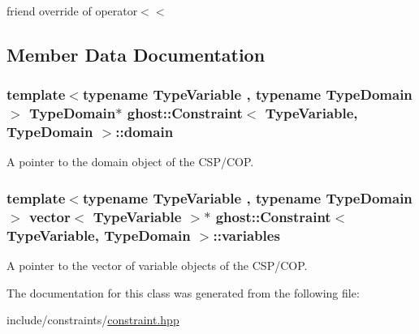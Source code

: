 friend override of operator$<$$<$ 



\subsection{Member Data Documentation}
\hypertarget{classghost_1_1Constraint_a0ea15d113ab23ddb6ad74be72f7ac90d}{
\subsubsection[{domain}]{\setlength{\rightskip}{0pt plus 5cm}template$<$typename Type\-Variable , typename Type\-Domain $>$ Type\-Domain$\ast$ {\bf ghost\-::\-Constraint}$<$ Type\-Variable, Type\-Domain $>$\-::domain\hspace{0.3cm}{\ttfamily [protected]}}}\label{classghost_1_1Constraint_a0ea15d113ab23ddb6ad74be72f7ac90d}


A pointer to the domain object of the C\-S\-P/\-C\-O\-P. 

\hypertarget{classghost_1_1Constraint_a827e487bd77c8dbc4701d1dfae39678a}{
\subsubsection[{variables}]{\setlength{\rightskip}{0pt plus 5cm}template$<$typename Type\-Variable , typename Type\-Domain $>$ vector$<$ Type\-Variable $>$$\ast$ {\bf ghost\-::\-Constraint}$<$ Type\-Variable, Type\-Domain $>$\-::variables\hspace{0.3cm}{\ttfamily [protected]}}}\label{classghost_1_1Constraint_a827e487bd77c8dbc4701d1dfae39678a}


A pointer to the vector of variable objects of the C\-S\-P/\-C\-O\-P. 



The documentation for this class was generated from the following file\-:\begin{DoxyCompactItemize}
\item 
include/constraints/\hyperlink{constraint_8hpp}{constraint.\-hpp}\end{DoxyCompactItemize}
